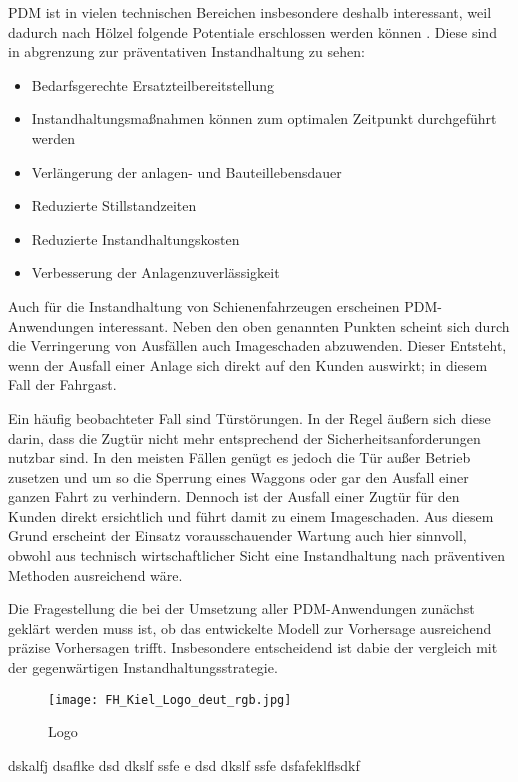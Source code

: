 PDM ist in vielen technischen Bereichen insbesondere deshalb interessant, weil  dadurch nach Hölzel folgende Potentiale erschlossen werden können . Diese sind in abgrenzung zur präventativen Instandhaltung zu sehen:
\begin{itemize}
	\item Bedarfsgerechte Ersatzteilbereitstellung
	\item Instandhaltungsmaßnahmen können zum optimalen Zeitpunkt durchgeführt werden
	\item Verlängerung der anlagen- und Bauteillebensdauer
	\item Reduzierte Stillstandzeiten
	\item Reduzierte Instandhaltungskosten
	\item Verbesserung der Anlagenzuverlässigkeit
\end{itemize}

Auch für die Instandhaltung von Schienenfahrzeugen erscheinen PDM-Anwendungen interessant. Neben den oben genannten Punkten scheint sich durch die Verringerung von Ausfällen auch Imageschaden abzuwenden. Dieser Entsteht, wenn  der Ausfall einer Anlage sich direkt auf den Kunden auswirkt; in diesem Fall der Fahrgast.

Ein häufig beobachteter Fall sind Türstörungen. In der Regel äußern sich diese darin, dass die Zugtür nicht mehr entsprechend der Sicherheitsanforderungen nutzbar sind. In den meisten Fällen genügt es jedoch die Tür außer Betrieb zusetzen und um so die Sperrung eines Waggons oder gar den Ausfall einer ganzen Fahrt zu verhindern. Dennoch ist der Ausfall einer Zugtür für den Kunden direkt ersichtlich und führt damit zu einem Imageschaden. Aus diesem Grund erscheint der Einsatz vorausschauender Wartung auch hier sinnvoll, obwohl aus technisch wirtschaftlicher Sicht eine Instandhaltung nach präventiven Methoden ausreichend wäre. 

Die Fragestellung die bei der Umsetzung aller PDM-Anwendungen zunächst geklärt werden muss ist, ob das entwickelte Modell zur Vorhersage ausreichend präzise Vorhersagen trifft. Insbesondere entscheidend ist dabie der vergleich mit der gegenwärtigen Instandhaltungsstrategie.

\begin{figure}[ht]
	\centering
	\texttt{[image: FH\_Kiel\_Logo\_deut\_rgb.jpg]}
	\caption{Logo}
	\label{fig:fhlogo}
\end{figure}

dskalfj dsaflke dsd dkslf ssfe e dsd dkslf ssfe dsfafeklflsdkf
